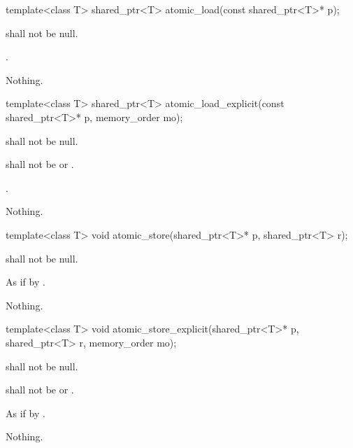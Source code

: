 %
\begin{itemdecl}
template<class T> shared_ptr<T> atomic_load(const shared_ptr<T>* p);
\end{itemdecl}

\begin{itemdescr}
\pnum
\requires {} shall not be null.

\pnum
\returns
{}.

\pnum
\throws
Nothing.
\end{itemdescr}

%
\begin{itemdecl}
template<class T> shared_ptr<T> atomic_load_explicit(const shared_ptr<T>* p, memory_order mo);
\end{itemdecl}

\begin{itemdescr}
\pnum
\requires {} shall not be null.

\pnum
\requires {} shall not be  or .

\pnum
\returns
{}.

\pnum
\throws
Nothing.
\end{itemdescr}

%
\begin{itemdecl}
template<class T> void atomic_store(shared_ptr<T>* p, shared_ptr<T> r);
\end{itemdecl}

\begin{itemdescr}
\pnum
\requires {} shall not be null.

\pnum
\effects
As if by .

\pnum
\throws
Nothing.
\end{itemdescr}

%
\begin{itemdecl}
template<class T> void atomic_store_explicit(shared_ptr<T>* p, shared_ptr<T> r, memory_order mo);
\end{itemdecl}

\begin{itemdescr}
\pnum
\requires {} shall not be null.

\pnum
\requires {} shall not be  or .

\pnum
\effects
As if by .

\pnum
\throws
Nothing.
\end{itemdescr}

